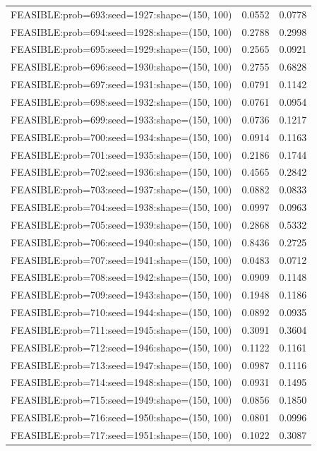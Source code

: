 \begin{longtable}{lcc}
FEASIBLE:prob=693:seed=1927:shape=(150, 100) &   0.0552 & 0.0778 \\
FEASIBLE:prob=694:seed=1928:shape=(150, 100) &   0.2788 & 0.2998 \\
FEASIBLE:prob=695:seed=1929:shape=(150, 100) &   0.2565 & 0.0921 \\
FEASIBLE:prob=696:seed=1930:shape=(150, 100) &   0.2755 & 0.6828 \\
FEASIBLE:prob=697:seed=1931:shape=(150, 100) &   0.0791 & 0.1142 \\
FEASIBLE:prob=698:seed=1932:shape=(150, 100) &   0.0761 & 0.0954 \\
FEASIBLE:prob=699:seed=1933:shape=(150, 100) &   0.0736 & 0.1217 \\
FEASIBLE:prob=700:seed=1934:shape=(150, 100) &   0.0914 & 0.1163 \\
FEASIBLE:prob=701:seed=1935:shape=(150, 100) &   0.2186 & 0.1744 \\
FEASIBLE:prob=702:seed=1936:shape=(150, 100) &   0.4565 & 0.2842 \\
FEASIBLE:prob=703:seed=1937:shape=(150, 100) &   0.0882 & 0.0833 \\
FEASIBLE:prob=704:seed=1938:shape=(150, 100) &   0.0997 & 0.0963 \\
FEASIBLE:prob=705:seed=1939:shape=(150, 100) &   0.2868 & 0.5332 \\
FEASIBLE:prob=706:seed=1940:shape=(150, 100) &   0.8436 & 0.2725 \\
FEASIBLE:prob=707:seed=1941:shape=(150, 100) &   0.0483 & 0.0712 \\
FEASIBLE:prob=708:seed=1942:shape=(150, 100) &   0.0909 & 0.1148 \\
FEASIBLE:prob=709:seed=1943:shape=(150, 100) &   0.1948 & 0.1186 \\
FEASIBLE:prob=710:seed=1944:shape=(150, 100) &   0.0892 & 0.0935 \\
FEASIBLE:prob=711:seed=1945:shape=(150, 100) &   0.3091 & 0.3604 \\
FEASIBLE:prob=712:seed=1946:shape=(150, 100) &   0.1122 & 0.1161 \\
FEASIBLE:prob=713:seed=1947:shape=(150, 100) &   0.0987 & 0.1116 \\
FEASIBLE:prob=714:seed=1948:shape=(150, 100) &   0.0931 & 0.1495 \\
FEASIBLE:prob=715:seed=1949:shape=(150, 100) &   0.0856 & 0.1850 \\
FEASIBLE:prob=716:seed=1950:shape=(150, 100) &   0.0801 & 0.0996 \\
FEASIBLE:prob=717:seed=1951:shape=(150, 100) &   0.1022 & 0.3087 \\

\end{longtable}
